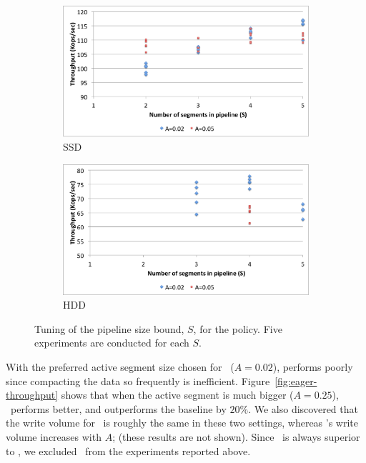 \begin{figure}[tb]

  \centering
  
  \begin{subfigure}[t]{\columnwidth}
      \includegraphics[width=\figw]{Figs/pipeline-1-ssd.png}
      \caption[]{SSD}
    \label{fig:pipeline:ssd}  
  \end{subfigure}   
  \begin{subfigure}[t]{\columnwidth}
      \includegraphics[width=\figw]{Figs/pipeline-1-hdd.png}
      \caption[]{HDD}
    \label{fig:pipeline:hdd}
  \end{subfigure}

\caption{Tuning of the pipeline size bound, $S$, for the \basic\/ policy. Five experiments are conducted for each $S$.} 
\label{fig:pipeline}
\end{figure}

With the preferred active segment size chosen for \basic\ ($A=0.02$), \eager\/ performs poorly since compacting the data so frequently is inefficient. 
Figure~\ref{fig:eager-throughput} shows that when the active segment is much bigger ($A=0.25$), \eager\ performs better, and outperforms the 
baseline by $20$\%. We also discovered that the write volume for \eager\ is roughly the same in these two settings, whereas \basic's write volume 
increases with $A$; (these results are not shown).  
Since \adp\ is always superior to \eager, we excluded \eager\ from the experiments reported above.  

